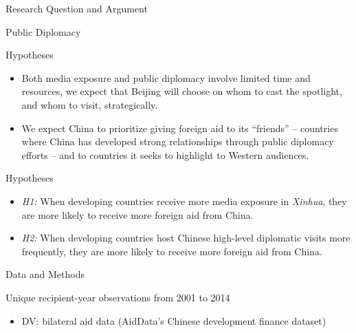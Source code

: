 \documentclass{beamer}
\begin{document}
\begin{frame}{Research Question and Argument}
\begin{frame}{Public Diplomacy}
\begin{itemize}
\end{itemize}

\end{frame}



\begin{frame}{Hypotheses}

\begin{itemize}

\item Both media exposure and public diplomacy involve limited time and resources,
we expect that Beijing will choose on whom to cast the spotlight, and whom to visit,
strategically. 

\item We expect China to prioritize giving foreign
aid to its “friends” -- countries where China has developed strong relationships through
public diplomacy efforts -- and to countries it seeks to highlight to Western audiences.

\end{itemize}

\end{frame}


\begin{frame}{Hypotheses} 

\begin{itemize} 
    \item \textit{H1:} When developing countries receive more media exposure in \textit{Xinhua}, they are more
likely to receive more foreign aid from China.
    \item \textit{H2:} When developing countries host Chinese high-level diplomatic visits more
frequently, they are more likely to receive more foreign aid from China.
\end{itemize}

\end{frame}




\begin{frame}{Data and Methods}

Unique recipient-year observations from 2001 to 2014

\begin{itemize} 

\item DV: bilateral aid data (AidData’s Chinese development finance dataset)


\end{itemize}
\end{frame}
\end{frame}
\end{document}
